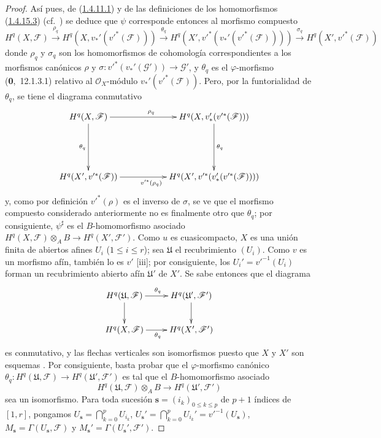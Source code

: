 \begin{proof}
Así pues, de (\hyperref[III.1.4.11.1]{1.4.11.1}) y de las definiciones de los homomorfismos (\hyperref[III.1.4.15.3]{1.4.15.3}) (cf.~) se deduce que $\psi$ corresponde entonces al morfismo compuesto
\[
H^q(X,\mathcal F)\xrightarrow{\rho_q}
H^q(X,v_*'(v'^*(\mathcal F)))\xrightarrow{\theta_q}
H^q(X',v'^*(v_*'(v'^*(\mathcal F))))\xrightarrow{\sigma_q}
H^q(X',v'^*(\mathcal F))
\]
donde $\rho_q$ y $\sigma_q$ son los homomorfismos de cohomología correspondientes a los morfismos canónicos $\rho$ y $\sigma:v'^*(v_*'(\mathcal G'))\to\mathcal G'$, y $\theta_q$ es el $\varphi$-morfismo (\textbf{0},~12.1.3.1) relativo al $\mathcal O_X$-módulo $v_*'(v'^*(\mathcal F))$.
Pero, por la funtorialidad de $\theta_q$, se tiene el diagrama conmutativo
\[
\xymatrix{
H^q(X,\mathcal F)\ar[rr]^{\rho_q}\ar[dd]_{\theta_q}
&&H^q(X,v_*'(v'^*(\mathcal F)))\ar[dd]^{\theta_q}\\\\
H^q(X',v'^*(\mathcal F))\ar[rr]_{v'^*(\rho_q)}
&&H^q(X',v'^*(v_*'(v'^*(\mathcal F))))
}
\]
y, como por definición  $v'^*(\rho)$ es el inverso de $\sigma$, se ve que el morfismo compuesto considerado anteriormente no es finalmente otro que $\theta_q$; por consiguiente, $\psi^\sharp$ es el $B$-homomorfismo asociado $H^q(X,\mathcal F)\otimes_A B\to H^q(X',\mathcal F')$.
Como $u$ es cuasicompacto, $X$ es una unión finita de abiertos afines $U_i$ ($1\leq i\leq r$); sea $\mathfrak U$ el recubrimiento $(U_i)$.
Como $v$ es un morfismo afín, también lo es $v'$ [iii]; por consiguiente, los $U_i'=v'^{-1}(U_i)$ forman un recubrimiento abierto afín $\mathfrak U'$ de $X'$.
Se sabe entonces  que el diagrama
\[
\xymatrix{
H^q(\mathfrak U,\mathcal F)\ar[r]^{\theta_q}\ar[d]
&H^q(\mathfrak U',\mathcal F')\ar[d]\\
H^q(X,\mathcal F)\ar[r]_{\theta_q}&H^q(X',\mathcal F')
}
\]
es conmutativo, y las flechas verticales son isomorfismos puesto que $X$ y $X'$ son esquemas .
Por consiguiente, basta probar que el $\varphi$-morfismo canónico $\theta_q:H^q(\mathfrak U,\mathcal F)\to H^q(\mathfrak U',\mathcal F')$ es tal que el $B$-homomorfismo asociado
\[
H^q(\mathfrak U,\mathcal F)\otimes_A B
\longrightarrow H^q(\mathfrak U',\mathcal F')
\]
sea un isomorfismo.
Para toda sucesión $\mathbf s=(i_k)_{0\leq k\leq p}$ de $p+1$ índices de $[1,r]$, pongamos $U_{\mathbf s}=\bigcap\limits_{k=0}^pU_{i_k}$, $U_{\mathbf s}'=\bigcap\limits_{k=0}^pU_{i_k}'=v'^{-1}(U_{\mathbf s})$, $M_{\mathbf s}=\Gamma(U_{\mathbf s},\mathcal F)$ y $M_{\mathbf s}'=\Gamma(U_{\mathbf s}',\mathcal F')$.

\end{proof}
